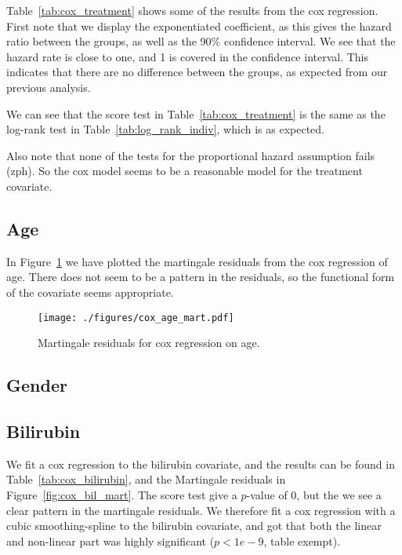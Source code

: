 \documentclass[11pt,a4paper]{article}
\begin{document}
Table~\ref{tab:cox_treatment} shows some of the results from the cox regression. First note that we display the exponentiated coefficient, as this gives the hazard ratio between the groups, as well as the 90\% confidence interval. We see that the hazard rate is close to one, and 1 is covered in the confidence interval. This indicates that there are no difference between the groups, as expected from our previous analysis.

We can see that the score test in Table~\ref{tab:cox_treatment} is the same as the log-rank test in Table~\ref{tab:log_rank_indiv}, which is as expected.

Also note that none of the tests for the proportional hazard assumption fails (zph).
So the cox model seems to be a reasonable model for the treatment covariate.




\subsection{Age}



In Figure~\ref{fig:cox_age_mart} we have plotted the martingale residuals from the cox regression of age. There does not seem to be a pattern in the residuals, so the functional form of the covariate seems appropriate.

\begin{figure}[h!tb]
    \begin{center}
        \texttt{[image: ./figures/cox\_age\_mart.pdf]}
    \end{center}
    \vspace{-0.2cm}
    \caption{Martingale residuals for cox regression on age.}
    \label{fig:cox_age_mart}
\end{figure}

\subsection{Gender}



\subsection{Bilirubin}

We fit a cox regression to the bilirubin covariate, and the results can be found in Table~\ref{tab:cox_bilirubin}, and the Martingale residuals in Figure~\ref{fig:cox_bil_mart}. The score test give a $p$-value of 0, but the we see a clear pattern in the martingale residuals. We therefore fit a cox regression with a cubic smoothing-spline to the bilirubin covariate, and got that both the linear and non-linear part was highly significant ($p < 1e-9$, table exempt).
\end{document}
